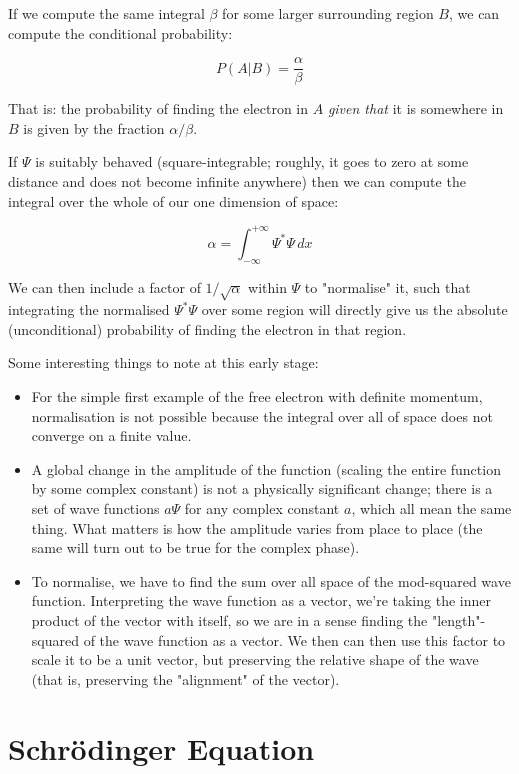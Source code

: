 If we compute the same integral $\beta$ for some larger surrounding region $B$, we can compute the conditional probability:

$$
P(A|B) = \frac{\alpha}{\beta}
$$

That is: the probability of finding the electron in $A$ \textit{given that} it is somewhere in $B$ is given by the fraction $\alpha / \beta$.

If $\Psi$ is suitably behaved (square-integrable; roughly, it goes to zero at some distance and does not become infinite anywhere) then we can compute the integral over the whole of our one dimension of space:

$$
\alpha =
\int_{-\infty}^{+\infty}
\Psi^*\Psi
\,dx
$$

We can then include a factor of $1/\sqrt{\alpha}$ within $\Psi$ to "normalise" it, such that integrating the normalised $\Psi^*\Psi$ over some region will directly give us the absolute (unconditional) probability of finding the electron in that region.

Some interesting things to note at this early stage:

\begin{itemize}
  \item For the simple first example of the free electron with definite momentum, normalisation is not possible because the integral over all of space does not converge on a finite value.
  \item A global change in the amplitude of the function (scaling the entire function by some complex constant) is not a physically significant change; there is a set of wave functions $a\Psi$ for any complex constant $a$, which all mean the same thing. What matters is how the amplitude varies from place to place (the same will turn out to be true for the complex phase).
  \item To normalise, we have to find the sum over all space of the mod-squared wave function. Interpreting the wave function as a vector, we're taking the inner product of the vector with itself, so we are in a sense finding the "length"-squared of the wave function as a vector. We then can then use this factor to scale it to be a unit vector, but preserving the relative shape of the wave (that is, preserving the "alignment" of the vector).
\end{itemize}

\section{Schrödinger Equation}

